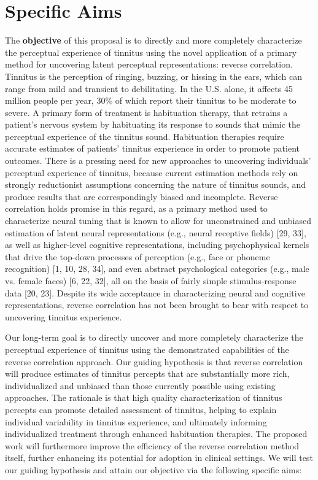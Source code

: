 \documentclass[11pt, notitlepage]{article} %
\begin{document}

\section*{Specific Aims}

The \textbf{objective} of this proposal is to directly and more completely characterize the perceptual experience of tinnitus using the novel application of a primary method for uncovering latent perceptual representations: reverse correlation. Tinnitus is the perception of ringing, buzzing, or hissing in the ears, which can range from mild and transient to debilitating. In the U.S. alone, it affects 45 million people per year, 30\% of which report their tinnitus to be moderate to severe. A primary form of treatment is habituation therapy, that retrains a patient's nervous system by habituating its response to sounds that mimic the perceptual experience of the tinnitus sound. Habituation therapies require accurate estimates of patients' tinnitus experience in order to promote patient outcomes. There is a pressing need for new approaches to uncovering individuals' perceptual experience of tinnitus, because current estimation methods rely on strongly reductionist assumptions concerning the nature of tinnitus sounds, and produce results that are correspondingly biased and incomplete. Reverse correlation holds promise in this regard, as a primary method used to characterize neural tuning that is known to allow for unconstrained and unbiased estimation of latent neural representations (e.g., neural receptive fields) [29, 33], as well as higher-level cognitive representations, including psychophysical kernels that drive the top-down processes of perception (e.g., face or phoneme recognition) [1, 10, 28, 34], and even abstract psychological categories (e.g., male vs. female faces) [6, 22, 32], all on the basis of fairly simple stimulus-response data [20, 23]. Despite its wide acceptance in characterizing neural and cognitive representations, reverse correlation has not been brought to bear with respect to uncovering tinnitus experience.

Our long-term goal is to directly uncover and more completely characterize the perceptual experience of tinnitus using the demonstrated capabilities of the reverse correlation approach. Our guiding hypothesis is that reverse correlation will produce estimates of tinnitus percepts that are substantially more rich, individualized and unbiased than those currently possible using existing approaches. The rationale is that high quality characterization of tinnitus percepts can promote detailed assessment of tinnitus, helping to explain individual variability in tinnitus experience, and ultimately informing individualized treatment through enhanced habituation therapies. The proposed work will furthermore improve the efficiency of the reverse correlation method itself, further enhancing its potential for adoption in clinical settings. We will test our guiding hypothesis and attain our objective via the following specific aims:
\end{document}
